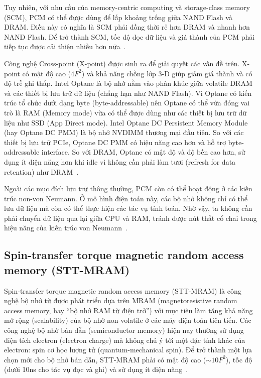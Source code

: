 Tuy nhiên, với nhu cầu của memory-centric computing và storage-class memory
(SCM), PCM có thể được dùng để lấp khoảng trống giữa NAND Flash và DRAM. Điều
này có nghĩa là SCM phải đồng thời rẻ hơn DRAM và nhanh hơn NAND Flash. Để trở
thành SCM, tốc độ đọc dữ liệu và giá thành của PCM phải tiếp tục được cải thiện
nhiều hơn nữa~\cite{kimEvolutionPhaseChangeMemory2020}.

Công nghệ Cross-point (X-point) được sinh ra để giải quyết các vấn đề trên.
X-point có mật độ cao ($4F^2$) và khả năng chồng lớp 3-D giúp giảm giá thành và
có độ trễ ghi thấp. Intel Optane là bộ nhớ nằm vào phân khúc giữa volatile DRAM
và các thiết bị lưu trữ dữ liệu (chẳng hạn như NAND Flash). Vì Optane có kiến
trúc tổ chức dưới dạng byte (byte-addressable) nên Optane có thể vừa đóng vai
trò là RAM (Memory mode) vừa có thể được dùng như các thiết bị lưu trữ dữ liệu
như SSD (App Direct mode). Intel Optane DC Persistent Memory Module (hay Optane
DC PMM) là bộ nhớ NVDIMM thương mại đầu tiên. So với các thiết bị lưu trữ PCIe,
Optane DC PMM có hiệu năng cao hơn và hỗ trợ byte-addressable interface. So với
DRAM, Optane có mật độ và độ bền cao hơn, sử dụng ít điện năng hơn khi idle vì
không cần phải làm tươi (refresh for data retention) như
DRAM~\cite{izraelevitzBasicPerformanceMeasurements2019}.

Ngoài các mục đích lưu trữ thông thường, PCM còn có thể hoạt động ở các kiến
trúc non-von Neumann. Ở mô hình điện toán này, các bộ nhớ không chỉ có thể lưu
dữ liệu mà còn có thể thực hiện các tác vụ tính toán. Nhờ vậy, ta không cần
phải chuyển dữ liệu qua lại giữa CPU và RAM, tránh được nút thắt cổ chai trong
hiệu năng của kiến trúc von Neumann~\cite{galloOverviewPhasechangeMemory2020}.

\subsection{Spin-transfer torque magnetic random access memory (STT-MRAM)}
Spin-transfer torque magnetic random access memory (STT-MRAM) là công nghệ bộ
nhớ từ được phát triển dựa trên MRAM (magnetoresistive random access memory,
hay ``bộ nhớ RAM từ điện trở'') với mục tiêu làm tăng khả năng mở rộng
(scalability) của bộ nhớ non-volatile ở các máy điện toán tiên tiến. Các công
nghệ bộ nhớ bán dẫn (semiconductor memory) hiện nay thường sử dụng điện tích
electron (electron charge) mà không chú ý tới một đặc tính khác của electron:
spin cơ học lượng tử (quantum-mechanical spin). Để trở thành một lựa chọn mới
cho bộ nhớ bán dẫn, STT-MRAM phải có mật độ cao ($\sim10F^2$), tốc độ (dưới
10ns cho tác vụ đọc và ghi) và sử dụng ít điện
năng~\cite{apalkovSpintransferTorqueMagnetic2013}.

